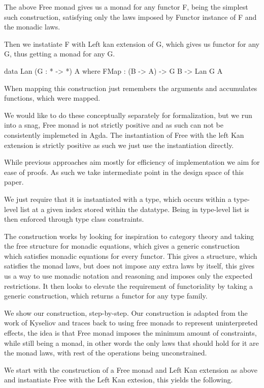 \documentclass[10pt]{article}
\theoremstyle{definition}
\theoremstyle{remark}
\begin{document}
The above Free monad gives us a monad for any functor F, being the simplest such construction, satisfying only the laws imposed by Functor instance of F and the monadic laws.

Then we instatiate F with Left kan extension of G, which gives us functor for any G, thus getting a monad for any G.

\begin{haskell}
	data Lan (G : * -> *) A where
		FMap : (B -> A) -> G B -> Lan G A
\end{haskell}
%

When mapping this construction just remembers the arguments and accumulates functions, which were mapped.

We would like to do these conceptually separately for formalization, but we run into a snag, Free monad is not strictly positive and as such can not be consistently implemeted in Agda. The instantiation of Free with the left Kan extension is strictly positive as such we just use the instantiation directly.

While previous approaches \cite{Kiselyov} aim mostly for efficiency of implementation we aim for ease of proofs. As such we take intermediate point in the design space of this paper.

We just require that
it is instantiated with a type, which occurs within a type-level list
at a given index stored within the datatype. Being in type-level list
is then enforced through type class constraints.

The construction works by looking for inspiration to category theory and taking the free structure for monadic equations, which gives a generic construction which satisfies monadic equations for every functor. This gives a structure, which satisfies the monad laws, but does not impose any extra laws by itself, this gives us a way to use monadic notation and reasoning and imposes only the expected restrictions.
It then looks to elevate the requirement of functoriality by taking a generic construction, which returns a functor for any type family.

We show our construction, step-by-step. Our construction is adapted from the work of Kyseliov \cite{freerm} and traces back to using free monads to represent uninterpreted effects, the idea is that Free monad imposes the minimum amount of constraints, while still being a monad, in other words the only laws that should hold for it are the monad laws, with rest of the operations being unconstrained.

We start with the construction of a Free monad and Left Kan extension as above and instantiate Free with the Left Kan extesion, this yields the following.
\end{document}
